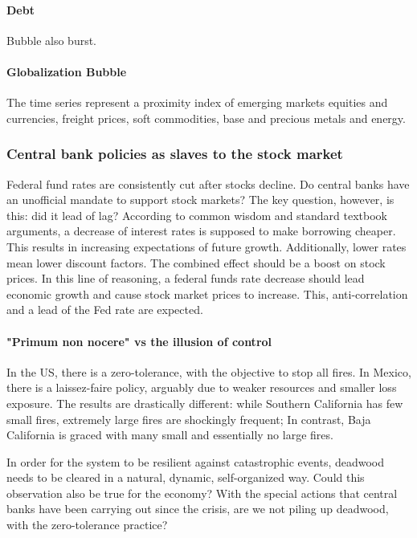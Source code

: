 \paragraph{Debt} Bubble also burst.

\paragraph{Globalization Bubble}

The time series represent a proximity index of emerging markets equities
and currencies, freight prices, soft commodities, base and precious metals
and energy.

\subsubsection{Central bank policies as slaves to the stock market}

Federal fund rates are consistently cut after stocks decline. Do central
banks have an unofficial mandate to support stock markets?
The key question, however, is this: did it lead of lag? According to common
wisdom and standard textbook arguments, a decrease of interest rates is
supposed to make borrowing cheaper. This results in increasing expectations
of future growth. Additionally, lower rates mean lower discount factors.
The combined effect should be a boost on stock prices. In this line of
reasoning, a federal funds rate decrease should lead economic growth and
cause stock market prices to increase. This, anti-correlation and a lead
of the Fed rate are expected.

\paragraph{"Primum non nocere" vs the illusion of control}

In the US, there is a zero-tolerance, with the objective to stop all fires.
In Mexico, there is a laissez-faire policy, arguably due to weaker resources
and smaller loss exposure. The results are drastically different: while
Southern California has few small fires, extremely large fires are shockingly
frequent; In contrast, Baja California is graced with many small and essentially
no large fires.

In order for the system to be resilient against catastrophic events, deadwood
needs to be cleared in a natural, dynamic, self-organized way. Could this
observation also be true for the economy? With the special actions that
central banks have been carrying out since the crisis, are we not piling up
deadwood, with the zero-tolerance practice?

